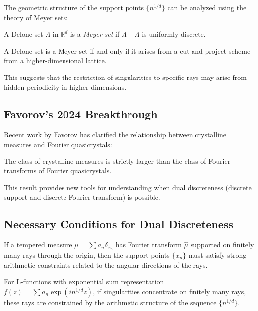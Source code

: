 The geometric structure of the support points $\{n^{1/d}\}$ can be analyzed using the theory of Meyer sets:

\begin{definition}
A Delone set $\Lambda$ in $\mathbb{R}^d$ is a \emph{Meyer set} if $\Lambda - \Lambda$ is uniformly discrete.
\end{definition}

\begin{theorem}
A Delone set is a Meyer set if and only if it arises from a cut-and-project scheme from a higher-dimensional lattice.
\end{theorem}

This suggests that the restriction of singularities to specific rays may arise from hidden periodicity in higher dimensions.

\subsection{Favorov's 2024 Breakthrough}

Recent work by Favorov has clarified the relationship between crystalline measures and Fourier quasicrystals:

\begin{theorem}[Favorov 2024]
The class of crystalline measures is strictly larger than the class of Fourier transforms of Fourier quasicrystals.
\end{theorem}

This result provides new tools for understanding when dual discreteness (discrete support and discrete Fourier transform) is possible.

\subsection{Necessary Conditions for Dual Discreteness}

\begin{theorem}
If a tempered measure $\mu = \sum a_n \delta_{x_n}$ has Fourier transform $\hat{\mu}$ supported on finitely many rays through the origin, then the support points $\{x_n\}$ must satisfy strong arithmetic constraints related to the angular directions of the rays.
\end{theorem}

\begin{corollary}
For L-functions with exponential sum representation $f(z) = \sum a_n \exp(i n^{1/d} z)$, if singularities concentrate on finitely many rays, these rays are constrained by the arithmetic structure of the sequence $\{n^{1/d}\}$.
\end{corollary}

